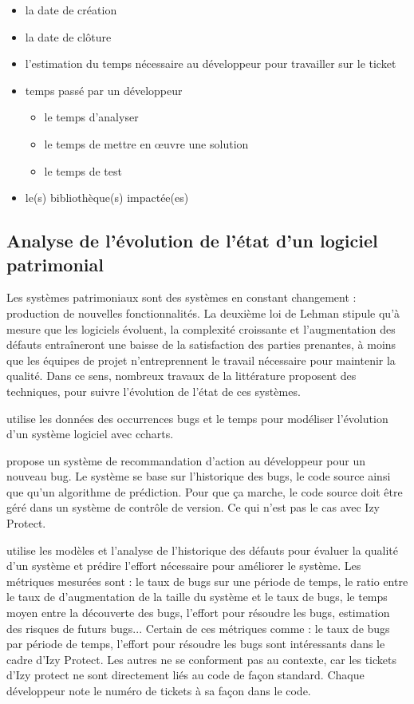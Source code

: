 \documentclass[a4paper]{article}
\begin{document}
\begin{itemize}
\item la date de création
\item la date de clôture
\item l'estimation du temps nécessaire au développeur pour travailler sur le ticket
\item temps passé par un développeur
\begin{itemize}
\item le temps d'analyser
\item le temps de mettre en œuvre une solution
\item le temps de test
\end{itemize}
\item le(s) bibliothèque(s) impactée(es)
\end{itemize}


\subsection{Analyse de l'évolution de l'état d'un logiciel patrimonial}
\label{sec:etatLogiciel}

Les systèmes patrimoniaux sont des systèmes en constant changement : production de nouvelles fonctionnalités.
La deuxième loi de Lehman \cite{Lehm96a} stipule qu'à mesure que les logiciels évoluent, la complexité croissante et l'augmentation des défauts entraîneront une baisse de la satisfaction des parties prenantes, à moins que les équipes de projet n'entreprennent le travail nécessaire pour maintenir la qualité.
Dans ce sens, nombreux travaux de la littérature proposent des techniques, pour suivre l'évolution de l'état de ces systèmes.

\citep{Zhan10b} utilise les données des occurrences bugs et le temps pour modéliser l'évolution d'un système logiciel avec c\-charts.

\citep{lenar17} propose un système de recommandation d'action au développeur pour un nouveau bug. Le système se base sur l'historique des bugs, le code source ainsi que qu'un algorithme de prédiction. Pour que ça marche, le code source doit être géré dans un système de contrôle de version. Ce qui n'est pas le cas avec Izy Protect.

\citep{port17} utilise les modèles et l'analyse de l'historique des défauts pour évaluer la qualité d'un système et prédire l'effort nécessaire pour améliorer le système. Les métriques mesurées sont : le taux de bugs sur une période de temps, le ratio entre le taux de d'augmentation de la taille du système et le taux de bugs, le temps moyen entre la découverte des bugs, l'effort pour résoudre les bugs, estimation des risques de futurs bugs...
Certain de ces métriques comme : le taux de bugs par période de temps, l'effort pour résoudre les bugs sont intéressants dans le cadre d'Izy Protect. 
Les autres ne se conforment pas au contexte, car les tickets d'Izy protect ne sont directement liés au code de façon standard.
Chaque développeur note le numéro de tickets à sa façon dans le code. 
\end{document}
